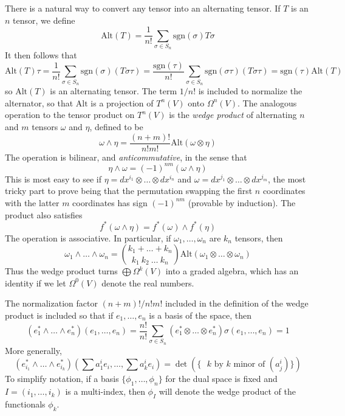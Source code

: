 There is a natural way to convert any tensor into an alternating tensor. If $T$ is an $n$ tensor, we define
%
\[ \text{Alt}(T) = \frac{1}{n!} \sum_{\sigma \in S_n} \text{sgn}(\sigma) T \sigma \]
%
It then follows that
%
\[ \text{Alt}(T) \tau = \frac{1}{n!} \sum_{\sigma \in S_n} \text{sgn}(\sigma) (T \sigma \tau) = \frac{\text{sgn}(\tau)}{n!} \sum_{\sigma \in S_n} \text{sgn}(\sigma \tau) (T \sigma \tau) = \text{sgn}(\tau) \text{Alt}(T) \]
%
so $\text{Alt}(T)$ is an alternating tensor. The term $1/n!$ is included to normalize the alternator, so that $\text{Alt}$ is a projection of $T^n(V)$ onto $\Omega^n(V)$. The analogous operation to the tensor product on $T^n(V)$ is the {\it wedge product} of alternating $n$ and $m$ tensors $\omega$ and $\eta$, defined to be
%
\[ \omega \wedge \eta = \frac{(n + m)!}{n! m!} \text{Alt}(\omega \otimes \eta) \]
%
The operation is bilinear, and {\it anticommutative}, in the sense that
%
\[ \eta \wedge \omega = (-1)^{nm} (\omega \wedge \eta) \]
%
This is most easy to see if $\eta = dx^{i_1} \otimes \dots \otimes dx^{i_n}$ and $\omega = dx^{j_1} \otimes \dots \otimes dx^{j_m}$, the most tricky part to prove being that the permutation swapping the first $n$ coordinates with the latter $m$ coordinates has sign $(-1)^{nm}$ (provable by induction). The product also satisfies
%
\[ f^*(\omega \wedge \eta) = f^*(\omega) \wedge f^*(\eta) \]
%
The operation is associative. In particular, if $\omega_1, \dots, \omega_n$ are $k_n$ tensors, then
%
\[ \omega_1 \wedge \dots \wedge \omega_n = {k_1 + \dots + k_n \choose k_1\ k_2\ \dots\ k_n} \text{Alt}(\omega_1 \otimes \dots \otimes \omega_n) \]
%
Thus the wedge product turns $\bigoplus \Omega^k(V)$ into a graded algebra, which has an identity if we let $\Omega^0(V)$ denote the real numbers.

The normalization factor $(n+m)!/n!m!$ included in the definition of the wedge product is included so that if $e_1, \dots, e_n$ is a basis of the space, then
%
\[ (e_1^* \wedge \dots \wedge e_n^*)(e_1, \dots, e_n) = \frac{n!}{n!} \sum_{\sigma\in S_n} (e_1^* \otimes \dots \otimes e_n^*) \sigma (e_1, \dots, e_n) = 1 \]
%
More generally,
%
\[ (e_{i_1}^* \wedge \dots \wedge e_{i_k}^*) \left( \sum a^i_1e_i, \dots, \sum a^i_ke_i \right) = \det \left( \{ \text{ $k$ by $k$ minor of $(a^i_j)$} \} \right) \]
%
To simplify notation, if a basis $\{ \phi_1, \dots, \phi_n \}$ for the dual space is fixed and $I = (i_1, \dots, i_k)$ is a multi-index, then $\phi_I$ will denote the wedge product of the functionals $\phi_k$.

